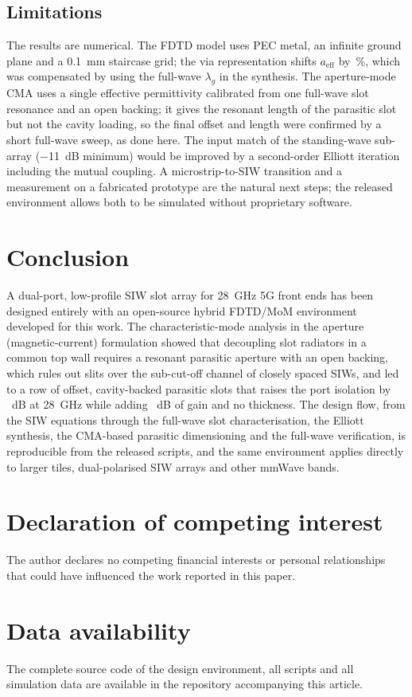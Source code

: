 \documentclass[preprint,12pt]{elsarticle}
\begin{document}
\subsection{Limitations}
The results are numerical. The FDTD model uses PEC metal, an infinite ground plane and a \SI{0.1}{mm} staircase grid; the via representation shifts $a_{\mathrm{eff}}$ by \aeffDiff\,\%, which was compensated by using the full-wave $\lambda_g$ in the synthesis. The aperture-mode CMA uses a single effective permittivity calibrated from one full-wave slot resonance and an open backing; it gives the resonant length of the parasitic slot but not the cavity loading, so the final offset and length were confirmed by a short full-wave sweep, as done here. The input match of the standing-wave sub-array (\SI{-11}{dB} minimum) would be improved by a second-order Elliott iteration including the mutual coupling. A microstrip-to-SIW transition and a measurement on a fabricated prototype are the natural next steps; the released environment allows both to be simulated without proprietary software.

\section{Conclusion}\label{sec:concl}
A dual-port, low-profile SIW slot array for 28~GHz 5G front ends has been designed entirely with an open-source hybrid FDTD/MoM environment developed for this work. The characteristic-mode analysis in the aperture (magnetic-current) formulation showed that decoupling slot radiators in a common top wall requires a resonant parasitic aperture with an open backing, which rules out slits over the sub-cut-off channel of closely spaced SIWs, and led to a row of offset, cavity-backed parasitic slots that raises the port isolation by \IsoGain~dB at 28~GHz while adding \GainDelta~dB of gain and no thickness. The design flow, from the SIW equations through the full-wave slot characterisation, the Elliott synthesis, the CMA-based parasitic dimensioning and the full-wave verification, is reproducible from the released scripts, and the same environment applies directly to larger tiles, dual-polarised SIW arrays and other mmWave bands.

\section*{Declaration of competing interest}
The author declares no competing financial interests or personal relationships that could have influenced the work reported in this paper.

\section*{Data availability}
The complete source code of the design environment, all scripts and all simulation data are available in the repository accompanying this article.



\end{document}
